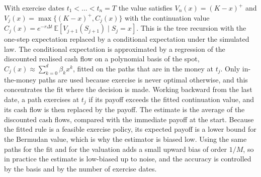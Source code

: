 With exercise dates $t_1<\dots<t_n=T$ the value satisfies $V_n(x)=(K-x)^+$ and $V_j(x)=\max\{(K-x)^+,C_j(x)\}$ with the continuation value $C_j(x)=e^{-r\Delta t}\,\mathbb E[V_{j+1}(S_{j+1})\mid S_j=x]$.
This is the tree recursion with the one-step expectation replaced by a conditional expectation under the simulated law.
The conditional expectation is approximated by a regression of the discounted realised cash flow on a polynomial basis of the spot, $C_j(x)\approx\sum_{k=0}^{d}\beta_kx^k$, fitted on the paths that are in the money at $t_j$.
Only in-the-money paths are used because exercise is never optimal otherwise, and this concentrates the fit where the decision is made.
Working backward from the last date, a path exercises at $t_j$ if its payoff exceeds the fitted continuation value, and its cash flow is then replaced by the payoff.
The estimate is the average of the discounted cash flows, compared with the immediate payoff at the start.
Because the fitted rule is a feasible exercise policy, its expected payoff is a lower bound for the Bermudan value, which is why the estimator is biased low.
Using the same paths for the fit and for the valuation adds a small upward bias of order $1/M$, so in practice the estimate is low-biased up to noise, and the accuracy is controlled by the basis and by the number of exercise dates.

